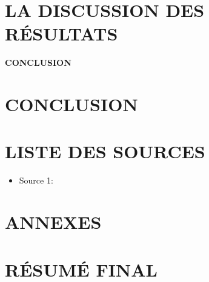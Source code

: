\documentclass[12pt,a4paper]{report}
\begin{document}
\chapter{LA DISCUSSION DES RÉSULTATS}
\lipsum[3-4]

\newpage
\thispagestyle{empty}
\begin{center}
\vspace*{\fill}
{\Huge\textbf{CONCLUSION}}
\vspace*{\fill}
\end{center}

\chapter{CONCLUSION}
\lipsum[5-6]

\newpage
{}
{}
\chapter*{LISTE DES SOURCES}
\begin{itemize}
    \item Source 1: \cite{source1}
\end{itemize}

\newpage
{}
{}
\printindex

\newpage
{}
{}



\appendix
\chapter*{ANNEXES}
\lipsum[8]

\newpage
\thispagestyle{empty}
\mbox{}

\newpage
{}
{}
\chapter*{RÉSUMÉ FINAL}
\lipsum[11]
\end{document}
